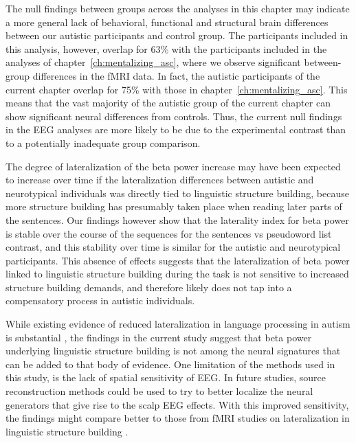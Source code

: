 The null findings between groups across the analyses in this chapter may indicate a more general lack of behavioral, functional and structural brain differences between our autistic participants and control group. The participants included in this analysis, however, overlap for 63\% with the participants included in the analyses of chapter~\ref{ch:mentalizing_asc}, where we observe significant between-group differences in the fMRI data. In fact, the autistic participants of the current chapter overlap for 75\% with those in chapter~\ref{ch:mentalizing_asc}. This means that the vast majority of the autistic group of the current chapter can show significant neural differences from controls. Thus, the current null findings in the EEG analyses are more likely to be due to the experimental contrast than to a potentially inadequate group comparison.

The degree of lateralization of the beta power increase may have been expected to increase over time if the lateralization differences between autistic and neurotypical individuals was directly tied to linguistic structure building, because more structure building has presumably taken place when reading later parts of the sentences. Our findings however show that the laterality index for beta power is stable over the course of the sequences for the sentences vs pseudoword list contrast, and this stability over time is similar for the autistic and neurotypical participants. This absence of effects suggests that the lateralization of beta power linked to linguistic structure building during the task is not sensitive to increased structure building demands, and therefore likely does not tap into a compensatory process in autistic individuals. 

While existing evidence of reduced lateralization in language processing in autism is substantial \citep{lindell2013}, the findings in the current study suggest that beta power underlying linguistic structure building is not among the neural signatures that can be added to that body of evidence. One limitation of the methods used in this study, is the lack of spatial sensitivity of EEG. In future studies, source reconstruction methods could be used to try to better localize the neural generators that give rise to the scalp EEG effects. With this improved sensitivity, the findings might compare better to those from fMRI studies on lateralization in linguistic structure building \citep{jouravlev2020}.

